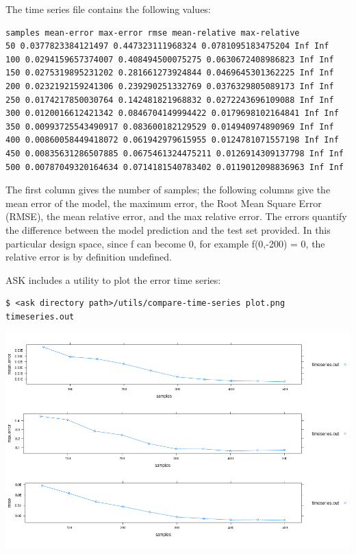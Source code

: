 The time series file contains the following values:
\begin{verbatim}
samples mean-error max-error rmse mean-relative max-relative
50 0.0377823384121497 0.447323111968324 0.0781095183475204 Inf Inf
100 0.0294159657374007 0.408494500075275 0.0630672408986823 Inf Inf
150 0.0275319895231202 0.281661273924844 0.0469645301362225 Inf Inf
200 0.0232192159241306 0.239290251332769 0.0376329805089173 Inf Inf
250 0.0174217850030764 0.142481821968832 0.0272243696109088 Inf Inf
300 0.0120016612421342 0.0846704149994422 0.0179698102164841 Inf Inf
350 0.00993725543490917 0.083600182129529 0.014940974890969 Inf Inf
400 0.00860058449418072 0.061942979615955 0.0124781071557198 Inf Inf
450 0.00835631286507885 0.0675461324475211 0.0126914309137798 Inf Inf
500 0.00787049320164634 0.0714181540783402 0.0119012098836963 Inf Inf
\end{verbatim}

The first column gives the number of samples; the following columns give the mean error of the model, the maximum error, the Root Mean Square Error (RMSE), the mean relative error, and the max relative error. The errors quantify the difference between the model prediction and the test set provided.
In this particular design space, since f can become 0, for example f(0,-200) = 0, the relative error is by definition undefined.

ASK includes a utility to plot the error time series:
\begin{verbatim}
$ <ask directory path>/utils/compare-time-series plot.png timeseries.out
\end{verbatim}

\begin{center}
  \includegraphics[width=\textwidth]{figures/ASK-gauss-timeseries.png}
\end{center}

